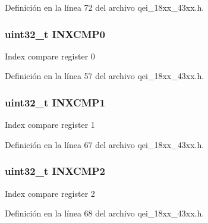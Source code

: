 Definición en la línea 72 del archivo qei\+\_\+18xx\+\_\+43xx.\+h.

\subsubsection[{\texorpdfstring{I\+N\+X\+C\+M\+P0}{INXCMP0}}]{ uint32\+\_\+t I\+N\+X\+C\+M\+P0}\hypertarget{struct_l_p_c___q_e_i___t_a81456f4f92613da6ce22e3f909f8b1e8}{}\label{struct_l_p_c___q_e_i___t_a81456f4f92613da6ce22e3f909f8b1e8}
Index compare register 0 

Definición en la línea 57 del archivo qei\+\_\+18xx\+\_\+43xx.\+h.

\subsubsection[{\texorpdfstring{I\+N\+X\+C\+M\+P1}{INXCMP1}}]{ uint32\+\_\+t I\+N\+X\+C\+M\+P1}\hypertarget{struct_l_p_c___q_e_i___t_a00462bb7f92d82f805575bb39b6dae03}{}\label{struct_l_p_c___q_e_i___t_a00462bb7f92d82f805575bb39b6dae03}
Index compare register 1 

Definición en la línea 67 del archivo qei\+\_\+18xx\+\_\+43xx.\+h.

\subsubsection[{\texorpdfstring{I\+N\+X\+C\+M\+P2}{INXCMP2}}]{ uint32\+\_\+t I\+N\+X\+C\+M\+P2}\hypertarget{struct_l_p_c___q_e_i___t_ad5eb9db7a4d2c373a59aac35536728b0}{}\label{struct_l_p_c___q_e_i___t_ad5eb9db7a4d2c373a59aac35536728b0}
Index compare register 2 

Definición en la línea 68 del archivo qei\+\_\+18xx\+\_\+43xx.\+h.

